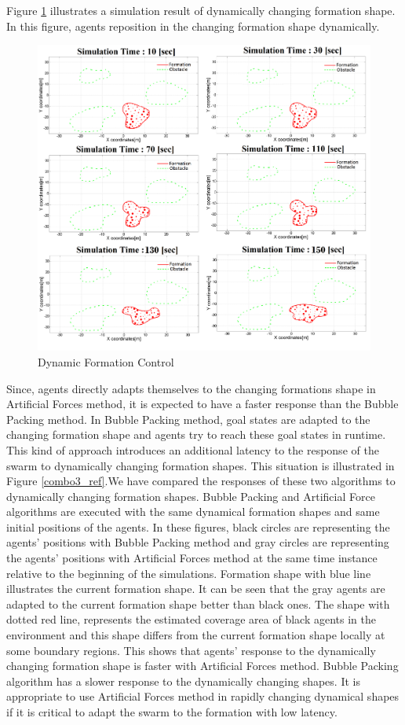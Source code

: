 \documentclass[letterpaper, 10 pt, conference]{ieeeconf}  %
\begin{document}
Figure \ref{multiple2_ref} illustrates a simulation result of dynamically changing formation shape. In this figure, agents reposition in the changing formation shape dynamically. 

\begin{figure}[thpb]
\caption{Dynamic Formation Control} \label{multiple2_ref}
\centerline{\includegraphics[scale = 0.10]{deneme}}
\end{figure} 

Since, agents directly adapts themselves to the changing formations shape in Artificial Forces method, it is expected to have a faster response than the Bubble Packing method. In Bubble Packing method, goal states are adapted to the changing formation shape and agents try to reach these goal states in runtime. This kind of approach introduces an additional latency to the response of the swarm to dynamically changing formation shapes. This situation is illustrated in Figure \ref{combo3_ref}.We have compared the responses of these two algorithms to dynamically changing formation shapes. Bubble Packing and Artificial Force algorithms are executed with the same dynamical formation shapes and same initial positions of the agents. In these figures, black circles are representing the agents' positions with Bubble Packing method and gray circles are representing the agents' positions with Artificial Forces method at the same time instance relative to the beginning of the simulations. Formation shape with blue line illustrates the current formation shape. It can be seen that the gray agents are adapted to the current formation shape better than black ones. The shape with dotted red line, represents the estimated coverage area of black agents in the environment and this shape differs from the current formation shape locally at some boundary regions. This shows that agents' response to the dynamically changing formation shape is faster with Artificial Forces method. Bubble Packing algorithm has a slower response to the dynamically changing shapes. It is appropriate to use Artificial Forces method in rapidly changing dynamical shapes if it is critical to adapt the swarm to the formation with low latency.
\end{document}

